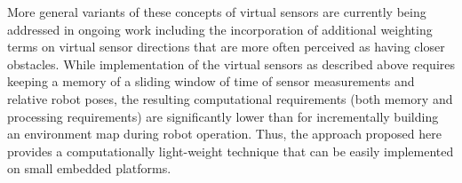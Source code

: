 More general variants of these concepts of virtual sensors are currently being addressed in ongoing work including the incorporation of additional weighting terms on virtual sensor directions that are more often perceived as having closer obstacles. While implementation of the virtual sensors as described above requires keeping a memory of a sliding window of time of sensor measurements and relative robot poses, the resulting computational requirements (both memory and processing requirements) are significantly lower than for incrementally building an environment map during robot operation.  Thus, the approach proposed here provides a computationally light-weight technique that can be easily implemented on small embedded platforms.
